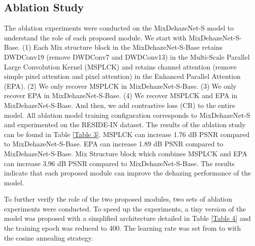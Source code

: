 \documentclass[10pt,twocolumn,letterpaper]{article}
\begin{document}
\subsection{Ablation Study}
The ablation experiments were conducted on the MixDehazeNet-S model to understand the role of each proposed module. We start with MixDehazeNet-S-Base. (1) Each Mix structure block in the MixDehazeNet-S-Base retains DWDConv19 (remove DWDConv7 and DWDConv13) in the Multi-Scale Parallel Large Convolution Kernel (MSPLCK) and retains channel attention (remove simple pixel attention and pixel attention) in the Enhanced Parallel Attention (EPA). (2) We only recover MSPLCK in MixDehazeNet-S-Base. (3) We only recover EPA in MixDehazeNet-S-Base. (4) We recover MSPLCK and EPA in MixDehazeNet-S-Base. And then, we add contrastive loss (CR) to the entire model. All ablation model training configuration corresponds to MixDehazeNet-S and experimented on the RESIDE-IN dataset. The results of the ablation study can be found in Table \ref{Table 3}. MSPLCK can increase 1.76 dB PSNR compared to MixDehazeNet-S-Base. EPA can increase 1.89 dB PSNR compared to MixDehazeNet-S-Base. Mix Structure block which combines MSPLCK and EPA can increase 3.96 dB PSNR compared to MixDehazeNet-S-Base. The results indicate that each proposed module can improve the dehazing performance of the model.

\begin{table}[t b p]
\renewcommand\arraystretch{1.5}
\centering
\caption{\centering Ablation Study on the RESIDE-IN dataset.}
\label{Table 3}
\end{table}

To further verify the role of the two proposed modules, two sets of ablation experiments were conducted. To speed up the experiments, a tiny version of the model was proposed with a simplified architecture detailed in Table \ref{Table 4} and the training epoch was reduced to 400. The learning rate was set from  to  with the cosine annealing strategy. 
\end{document}
